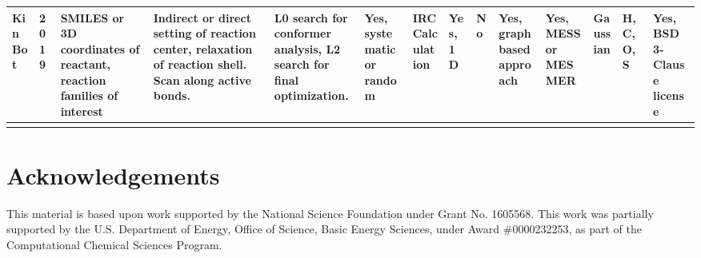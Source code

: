 \documentclass[preprint, 11pt]{elsarticle} %
\begin{document}
\begin{center}
\begin{singlespace}
\begin{adjustbox}{angle=90}
\begin{scriptsize}
\begin{tabular}{m{0.45in}||m{0.25in} | m{0.45in} | m{0.8in} | m{0.7in}| m{0.5in}| m{0.5in }|m{0.45in}| m{0.45in}| m{0.5in}| m{0.45in}| m{0.5in}| m{0.5in} | m{0.45in}}
    \hline
    KinBot  & 2019 & SMILES or 3D coordinates of reactant, reaction families of interest & Indirect or direct setting of reaction center, relaxation of reaction shell. Scan along active bonds.  & L0 search for conformer analysis, L2 search for final optimization. & Yes, systematic or random & IRC Calculation & Yes, 1D & No & Yes, graph based approach & Yes, MESS or MESMER & Gaussian & H, C, O, S & Yes, BSD 3-Clause license \\ 
    \hline
    \label{table:comparison}

\end{tabular}
\end{scriptsize}
\end{adjustbox}
\end{singlespace}
\end{center}
\restoregeometry

\section{Acknowledgements}

This material is based upon work supported by the National Science Foundation under Grant No. 1605568.
This work was partially supported by the U.S. Department of Energy, Office of Science, Basic Energy Sciences, under Award \#0000232253, as part of the Computational Chemical Sciences Program.





\end{document}
